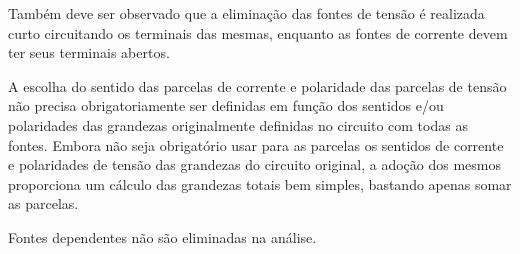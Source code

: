 \documentclass[12pt,fleqn]{book} %
\begin{document}
{Também deve ser observado que a eliminação das fontes de tensão é realizada curto circuitando os terminais das mesmas, enquanto as fontes de corrente devem ter seus terminais abertos.

\begin{remark}
A escolha do sentido das parcelas de corrente e polaridade das parcelas de tensão não precisa obrigatoriamente ser definidas em função dos sentidos e/ou polaridades das grandezas originalmente definidas no circuito com todas as fontes. Embora não seja obrigatório usar para as parcelas os sentidos de corrente e polaridades de tensão das grandezas do circuito original, a adoção dos mesmos proporciona um cálculo das grandezas totais bem simples, bastando apenas somar as parcelas.
\end{remark}

\begin{remark}
Fontes dependentes não são eliminadas na análise.
\end{remark}

}


	 
\end{document}
